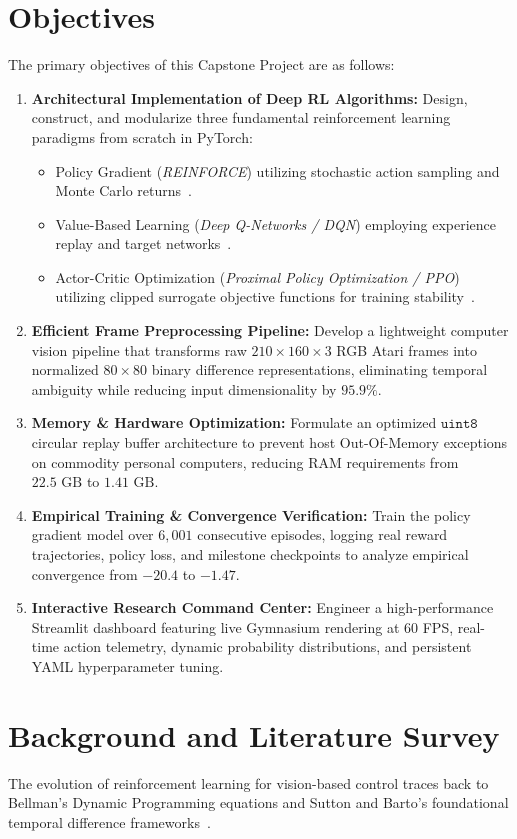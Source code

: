 \documentclass[12pt,a4paper]{report}
\begin{document}
\section{Objectives}
The primary objectives of this Capstone Project are as follows:
\begin{enumerate}
    \item \textbf{Architectural Implementation of Deep RL Algorithms:} Design, construct, and modularize three fundamental reinforcement learning paradigms from scratch in PyTorch:
    \begin{itemize}
        \item Policy Gradient (\textit{REINFORCE}) utilizing stochastic action sampling and Monte Carlo returns~\cite{williams1992simple}.
        \item Value-Based Learning (\textit{Deep Q-Networks / DQN}) employing experience replay and target networks~\cite{mnih2015human}.
        \item Actor-Critic Optimization (\textit{Proximal Policy Optimization / PPO}) utilizing clipped surrogate objective functions for training stability~\cite{schulman2017proximal}.
    \end{itemize}
    \item \textbf{Efficient Frame Preprocessing Pipeline:} Develop a lightweight computer vision pipeline that transforms raw $210 \times 160 \times 3$ RGB Atari frames into normalized $80 \times 80$ binary difference representations, eliminating temporal ambiguity while reducing input dimensionality by $95.9\%$.
    \item \textbf{Memory & Hardware Optimization:} Formulate an optimized $\texttt{uint8}$ circular replay buffer architecture to prevent host Out-Of-Memory exceptions on commodity personal computers, reducing RAM requirements from $22.5\text{ GB}$ to $1.41\text{ GB}$.
    \item \textbf{Empirical Training & Convergence Verification:} Train the policy gradient model over $6,001$ consecutive episodes, logging real reward trajectories, policy loss, and milestone checkpoints to analyze empirical convergence from $-20.4$ to $-1.47$.
    \item \textbf{Interactive Research Command Center:} Engineer a high-performance Streamlit dashboard featuring live Gymnasium rendering at 60 FPS, real-time action telemetry, dynamic probability distributions, and persistent YAML hyperparameter tuning.
\end{enumerate}

\section{Background and Literature Survey}
The evolution of reinforcement learning for vision-based control traces back to Bellman's Dynamic Programming equations and Sutton and Barto's foundational temporal difference frameworks~\cite{sutton2018reinforcement}. 
\end{document}
